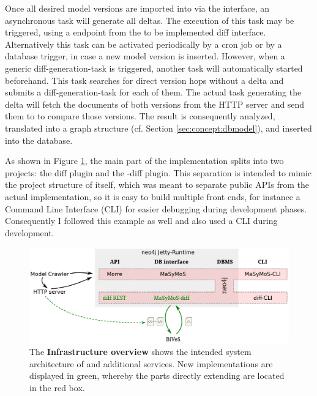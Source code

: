 Once all desired model versions are imported into \masymos via the \morre interface, an  asynchronous task will generate all deltas. The execution of this task may be triggered, using a \rest endpoint from the to be implemented diff \rest interface. Alternatively this task can be activated periodically by a cron job or by a database trigger, in case a new model version is inserted.
However, when a generic diff-generation-task is triggered, another task will automatically started beforehand. This task searches for direct version hops without a delta and submits a diff-generation-task for each of them. 
The actual task generating the delta will fetch the \xml documents of both versions from the HTTP server and send them to \bives to compare those versions. The result is consequently analyzed, translated into a graph structure (cf. Section \ref{sec:concept:dbmodel}), and inserted into the database.

As shown in Figure \ref{fig:system-overview}, the main part of the implementation splits into two projects: the diff \rest plugin and the \masymos-diff plugin. This separation is intended to mimic the project structure of \masymos itself, which was meant to separate public APIs from the actual implementation, so it is easy to build multiple front ends, for instance a Command Line Interface (CLI) for easier debugging during development phases. Consequently I followed this example as well and also used a CLI during development.

\begin{figure}[h]
	\centering
	\includegraphics[width=\textwidth]{resources/system-overview-matrix.pdf}
	\caption[Infrastructure overview]{The \textbf{Infrastructure overview} shows the intended system architecture of \masymos \neoj and additional services. New implementations are displayed in green, whereby the parts directly extending \neoj are located in the red box.}
	\label{fig:system-overview}
\end{figure}

